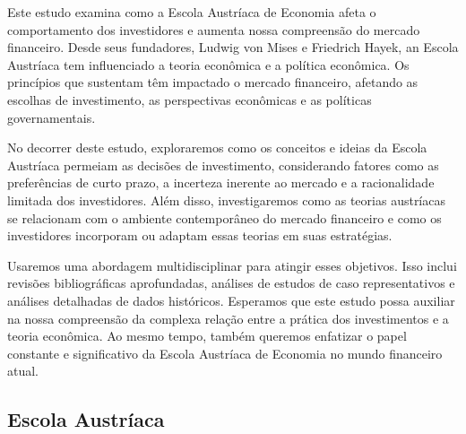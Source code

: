 \documentclass[a4paper,12pt]{article}
\begin{document}
Este estudo examina como a Escola Austríaca de Economia afeta o comportamento dos 
investidores e aumenta nossa compreensão do mercado financeiro. Desde seus fundadores, 
Ludwig von Mises e Friedrich Hayek, an Escola Austríaca tem influenciado a teoria econômica 
e a política econômica. Os princípios que sustentam têm impactado o mercado financeiro, 
afetando as escolhas de investimento, as perspectivas econômicas e as políticas governamentais.

No decorrer deste estudo, exploraremos como os conceitos e ideias da Escola Austríaca 
permeiam as decisões de investimento, considerando fatores como as preferências de curto prazo, 
a incerteza inerente ao mercado e a racionalidade limitada dos investidores. Além disso, 
investigaremos como as teorias austríacas se relacionam com o ambiente contemporâneo do 
mercado financeiro e como os investidores incorporam ou adaptam essas teorias em suas estratégias.

Usaremos uma abordagem multidisciplinar para atingir esses objetivos. Isso inclui revisões 
bibliográficas aprofundadas, análises de estudos de caso representativos e análises detalhadas 
de dados históricos. Esperamos que este estudo possa auxiliar na nossa compreensão da complexa relação 
entre a prática dos investimentos e a teoria econômica. Ao mesmo tempo, também queremos enfatizar 
o papel constante e significativo da Escola Austríaca de Economia no mundo financeiro atual.

\subsection{Escola Austríaca}
\end{document}
